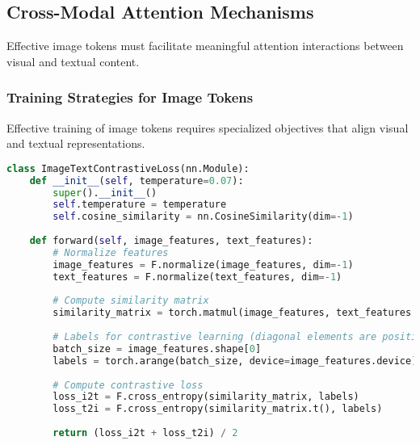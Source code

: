 \subsection{Cross-Modal Attention Mechanisms}

Effective image tokens must facilitate meaningful attention interactions between visual and textual content.

\subsubsection{Training Strategies for Image Tokens}

Effective training of image tokens requires specialized objectives that align visual and textual representations.

\begin{lstlisting}[language=Python, caption=Contrastive learning for image-text alignment]
class ImageTextContrastiveLoss(nn.Module):
    def __init__(self, temperature=0.07):
        super().__init__()
        self.temperature = temperature
        self.cosine_similarity = nn.CosineSimilarity(dim=-1)
    
    def forward(self, image_features, text_features):
        # Normalize features
        image_features = F.normalize(image_features, dim=-1)
        text_features = F.normalize(text_features, dim=-1)
        
        # Compute similarity matrix
        similarity_matrix = torch.matmul(image_features, text_features.t()) / self.temperature
        
        # Labels for contrastive learning (diagonal elements are positive pairs)
        batch_size = image_features.shape[0]
        labels = torch.arange(batch_size, device=image_features.device)
        
        # Compute contrastive loss
        loss_i2t = F.cross_entropy(similarity_matrix, labels)
        loss_t2i = F.cross_entropy(similarity_matrix.t(), labels)
        
        return (loss_i2t + loss_t2i) / 2
\end{lstlisting}
\begin{comment}
Feedback: The code for contrastive loss is correct, but the concept can be unintuitive. A simple explanation would be very valuable. For example: "The goal of contrastive learning (like in CLIP) is to train the model to 'match' correct image-text pairs. In a batch of data, it pulls the representations of a correct pair (e.g., an image of a cat and the text 'a photo of a cat') closer together in the embedding space, while pushing away the representations of incorrect pairs (e.g., the image of a cat and the text 'a photo of a dog'). This forces the image and text tokens to learn a shared, aligned semantic space."
\end{comment}

